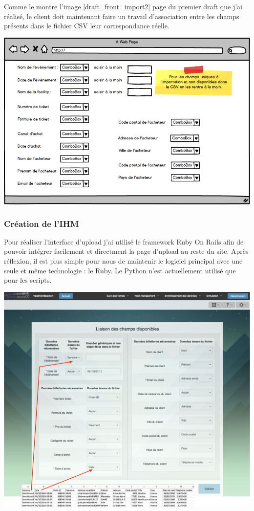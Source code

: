 Comme le montre l'image \ref{draft_front_import2} page \pageref{draft_front_import2} du premier draft que j'ai réalisé, le client doit maintenant faire un travail d'association entre les champs présents dans le fichier CSV leur correspondance réelle. 

\begin{center}
\includegraphics[scale=0.55]{images/front3.png}
\label{draft_front_import2}
\end{center}


\subsubsection{Création de l'IHM}
Pour réaliser l'interface d'upload j'ai utilisé le framework Ruby On Rails afin de pouvoir intégrer facilement et directment la page d'upload au reste du site. Après réflexion, il est plus simple pour nous de maintenir le logiciel principal avec une seule et même technologie : le Ruby. Le Python n'est actuellement utilisé que pour les scripts.

\begin{center}
\includegraphics[scale=0.37]{images/final_front2.png}
\label{final_front_import2}
\end{center}

